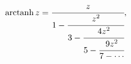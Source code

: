 \[\mathop{\mathrm{arctanh}\/}\nolimits z=\cfrac{z}{1-\cfrac{z^{2}}{3-\cfrac{4z^{%
2}}{5-\cfrac{9z^{2}}{7-\cdots}}}},\]